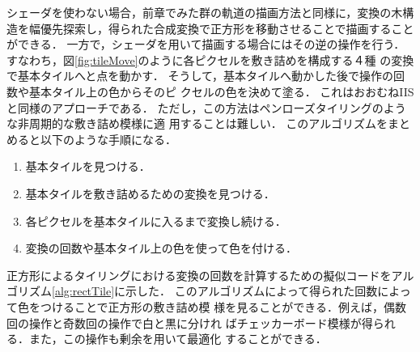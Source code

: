 シェーダを使わない場合，前章でみた群の軌道の描画方法と同様に，変換の木構
造を幅優先探索し，得られた合成変換で正方形を移動させることで描画すること
ができる．
一方で，シェーダを用いて描画する場合にはその逆の操作を行う．
すなわち，図\ref{fig:tileMove}のように各ピクセルを敷き詰めを構成する４種
の変換で基本タイルへと点を動かす．
そうして，基本タイルへ動かした後で操作の回数や基本タイル上の色からそのピ
クセルの色を決めて塗る．
これはおおむねIISと同様のアプローチである．
ただし，この方法はペンローズタイリングのような非周期的な敷き詰め模様に適
用することは難しい．
このアルゴリズムをまとめると以下のような手順になる．
\begin{enumerate}
 \item 基本タイルを見つける．
 \item 基本タイルを敷き詰めるための変換を見つける．
 \item 各ピクセルを基本タイルに入るまで変換し続ける．
 \item 変換の回数や基本タイル上の色を使って色を付ける．
\end{enumerate}

正方形によるタイリングにおける変換の回数を計算するための擬似コードをアル
ゴリズム\ref{alg:rectTile}に示した．
このアルゴリズムによって得られた回数によって色をつけることで正方形の敷き詰め模
様を見ることができる．例えば，偶数回の操作と奇数回の操作で白と黒に分けれ
ばチェッカーボード模様が得られる．また，この操作も剰余を用いて最適化
することができる．

